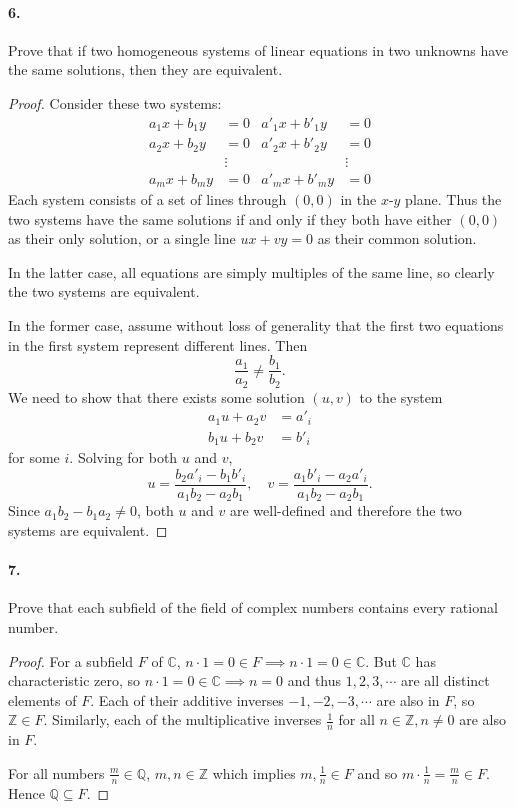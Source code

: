 \documentclass{article}
\begin{document}
\paragraph{6.} Prove that if two homogeneous systems of linear equations in two
unknowns have the same solutions, then they are equivalent.

\begin{proof}
  Consider these two systems:
  \begin{align*}
    a_1x + b_1y &= 0 & a'_1x + b'_1y &= 0 \\
    a_2x + b_2y &= 0 & a'_2x + b'_2y &= 0 \\
    &\vdots & &\vdots \\
    a_mx + b_my &= 0 & a'_mx + b'_my &= 0
  \end{align*}
  Each system consists of a set of lines through $(0, 0)$ in the $x$-$y$ plane.
  Thus the two systems have the same solutions if and only if they both have
  either $(0, 0)$ as their only solution, or a single line $ux + vy = 0$ as
  their common solution.

  In the latter case, all equations are simply multiples of the same line, so
  clearly the two systems are equivalent.

  In the former case, assume without loss of generality that the first two
  equations in the first system represent different lines. Then \[
    \frac{a_1}{a_2} \neq \frac{b_1}{b_2}.
  \] We need to show that there exists some solution $(u, v)$ to the system
  \begin{align*}
    a_1u + a_2v &= a'_i \\
    b_1u + b_2v &= b'_i
  \end{align*}
  for some $i$. Solving for both $u$ and $v$, \[
    u = \frac{b_2a'_i - b_1b'_i}{a_1b_2 - a_2b_1}, \quad
    v = \frac{a_1b'_i - a_2a'_i}{a_1b_2 - a_2b_1}.
  \] Since $a_1b_2 - b_1a_2 \neq 0$, both $u$ and $v$ are
  well-defined and therefore the two systems are equivalent.
\end{proof}

\paragraph{7.} Prove that each subfield of the field of complex numbers contains
every rational number.

\begin{proof}
  For a subfield $F$ of $\mathbb{C}$, $n \cdot 1 = 0 \in F \implies n \cdot 1 =
  0 \in \mathbb{C}$. But $\mathbb{C}$ has characteristic zero, so $n \cdot 1 = 0
  \in \mathbb{C} \implies n = 0$ and thus $1, 2, 3, \cdots$ are all distinct
  elements of $F$. Each of their additive inverses $-1, -2, -3, \cdots$ are also in
  $F$, so $\mathbb{Z} \in F$. Similarly, each of the multiplicative inverses
  $\frac{1}{n}$ for all $n \in \mathbb{Z}, n \neq 0$ are also in $F$.

  For all numbers $\frac{m}{n} \in \mathbb{Q}$, $m, n \in \mathbb{Z}$ which
  implies $m, \frac{1}{n} \in F$ and so $m \cdot \frac{1}{n} = \frac{m}{n} \in
  F$. Hence $\mathbb{Q} \subseteq F$.
\end{proof}
\end{document}
